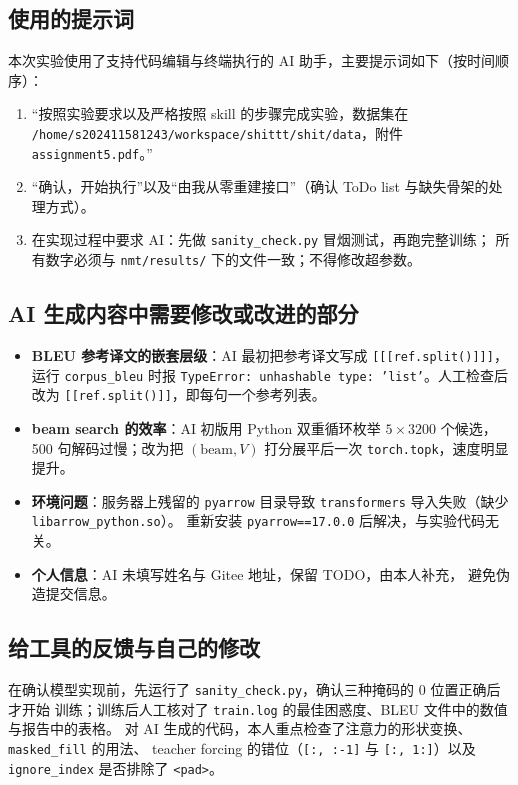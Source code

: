 \documentclass[UTF8,a4paper,11pt]{ctexart}
\begin{document}
\subsection*{使用的提示词}
本次实验使用了支持代码编辑与终端执行的 AI 助手，主要提示词如下（按时间顺序）：
\begin{enumerate}
  \item “按照实验要求以及严格按照 skill 的步骤完成实验，数据集在
        \texttt{/home/s202411581243/workspace/shittt/shit/data}，附件
        \texttt{assignment5.pdf}。”
  \item “确认，开始执行”以及“由我从零重建接口”（确认 ToDo list 与缺失骨架的处理方式）。
  \item 在实现过程中要求 AI：先做 \texttt{sanity\_check.py} 冒烟测试，再跑完整训练；
        所有数字必须与 \texttt{nmt/results/} 下的文件一致；不得修改超参数。
\end{enumerate}

\subsection*{AI 生成内容中需要修改或改进的部分}
\begin{itemize}
  \item \textbf{BLEU 参考译文的嵌套层级}：AI 最初把参考译文写成
        \texttt{[[[ref.split()]]]}，运行 \texttt{corpus\_bleu} 时报
        \texttt{TypeError: unhashable type: 'list'}。人工检查后改为
        \texttt{[[ref.split()]]}，即每句一个参考列表。
  \item \textbf{beam search 的效率}：AI 初版用 Python 双重循环枚举
        $5\times3200$ 个候选，500 句解码过慢；改为把
        $(\text{beam},V)$ 打分展平后一次 \texttt{torch.topk}，速度明显提升。
  \item \textbf{环境问题}：服务器上残留的 \texttt{pyarrow} 目录导致
        \texttt{transformers} 导入失败（缺少 \texttt{libarrow\_python.so}）。
        重新安装 \texttt{pyarrow==17.0.0} 后解决，与实验代码无关。
  \item \textbf{个人信息}：AI 未填写姓名与 Gitee 地址，保留 TODO，由本人补充，
        避免伪造提交信息。
\end{itemize}

\subsection*{给工具的反馈与自己的修改}
在确认模型实现前，先运行了 \texttt{sanity\_check.py}，确认三种掩码的 0 位置正确后才开始
训练；训练后人工核对了 \texttt{train.log} 的最佳困惑度、BLEU 文件中的数值与报告中的表格。
对 AI 生成的代码，本人重点检查了注意力的形状变换、\texttt{masked\_fill} 的用法、
teacher forcing 的错位（\texttt{[:, :-1]} 与 \texttt{[:, 1:]}）以及
\texttt{ignore\_index} 是否排除了 \texttt{<pad>}。
\end{document}
